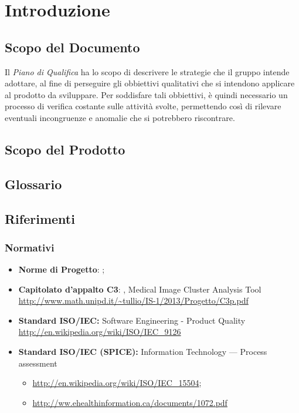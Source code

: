 \section{Introduzione}
\label{introduzione}

\subsection{Scopo del Documento}
\label{scopo_del_documento}
Il \textit{Piano di Qualifica} ha lo scopo di descrivere le strategie che il gruppo intende adottare, al fine di perseguire gli obbiettivi qualitativi che si intendono applicare al prodotto da sviluppare. Per soddisfare tali obbiettivi, è quindi necessario un processo di verifica costante sulle attività svolte, permettendo così di rilevare eventuali incongruenze e anomalie che si potrebbero riscontrare.

\subsection{Scopo del Prodotto}
\label{scopo_del_prodotto}
\scopoProd{}
\subsection{Glossario}
\label{glossario}
\glossIntro{}
\subsection{Riferimenti}
\label{riferimenti}

\subsubsection{Normativi}
\begin{itemize}
	\item \textbf{Norme di Progetto}: \NdP;
	\item \textbf{Capitolato d'appalto C3}: \project, Medical Image Cluster Analysis Tool
	\url{http://www.math.unipd.it/~tullio/IS-1/2013/Progetto/C3p.pdf}
	\item \textbf{Standard ISO\glossario /IEC:} Software Engineering - Product Quality 
	\url{http://en.wikipedia.org/wiki/ISO/IEC_9126}
	\item \textbf{Standard ISO\glossario /IEC (SPICE):} Information Technology — Process assessment
	\begin{itemize}			
		\item \url{http://en.wikipedia.org/wiki/ISO/IEC_15504};
		\item \url{http://ww.ehealthinformation.ca/documents/1072.pdf}
	\end{itemize}
\end{itemize}
